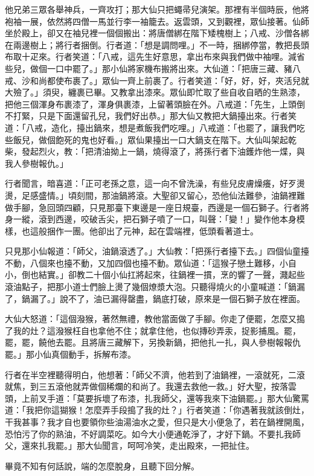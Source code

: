他兄弟三眾各舉神兵，一齊攻打；那大仙只把蠅帚兒演架。那裡有半個時辰，他將袍袖一展，依然將四僧一馬並行李一袖籠去。返雲頭，又到觀裡，眾仙接著。仙師坐於殿上，卻又在袖兒裡一個個搬出：將唐僧綁在階下矮槐樹上；八戒、沙僧各綁在兩邊樹上；將行者捆倒。行者道：「想是調問哩。」不一時，捆綁停當，教把長頭布取十疋來。行者笑道：「八戒，這先生好意思，拿出布來與我們做中袖哩。減省些兒，做個一口中罷了。」那小仙將家機布搬將出來。大仙道：「把唐三藏、豬八戒、沙和尚都使布裹了。」眾仙一齊上前裹了。行者笑道：「好，好，好，夾活兒就大殮了。」須臾，纏裹已畢。又教拿出漆來。眾仙即忙取了些自收自晒的生熟漆，把他三個渾身布裹漆了，渾身俱裹漆，上留著頭臉在外。八戒道：「先生，上頭倒不打緊，只是下面還留孔兒，我們好出恭。」那大仙又教把大鍋擡出來。行者笑道：「八戒，造化，擡出鍋來，想是煮飯我們吃哩。」八戒道：「也罷了，讓我們吃些飯兒，做個飽死的鬼也好看。」眾仙果擡出一口大鍋支在階下。大仙叫架起乾柴，發起烈火，教：「把清油拗上一鍋，燒得滾了，將孫行者下油鑊炸他一煠，與我人參樹報仇。」

行者聞言，暗喜道：「正可老孫之意，這一向不曾洗澡，有些兒皮膚燥癢，好歹燙燙，足感盛情。」頃刻間，那油鍋將滾。大聖卻又留心，恐他仙法難參，油鍋裡難做手腳，急回頭四顧，只見那臺下東邊是一座日規臺，西邊是一個石獅子。行者將身一縱，滾到西邊，咬破舌尖，把石獅子噴了一口，叫聲：「變！」變作他本身模樣，也這般捆作一團。他卻出了元神，起在雲端裡，低頭看著道士。

只見那小仙報道：「師父，油鍋滾透了。」大仙教：「把孫行者擡下去。」四個仙童擡不動，八個來也擡不動，又加四個也擡不動。眾仙道：「這猴子戀土難移，小自小，倒也結實。」卻教二十個小仙扛將起來，往鍋裡一摜，烹的響了一聲，濺起些滾油點子，把那小道士們臉上燙了幾個燎漿大泡。只聽得燒火的小童喊道：「鍋漏了，鍋漏了。」說不了，油已漏得罄盡，鍋底打破，原來是一個石獅子放在裡面。

大仙大怒道：「這個潑猴，著然無禮，教他當面做了手腳。你走了便罷，怎麼又搗了我的灶？這潑猴枉自也拿他不住；就拿住他，也似摶砂弄汞，捉影捕風。罷，罷，罷，饒他去罷。且將唐三藏解下，另換新鍋，把他扎一扎，與人參樹報報仇罷。」那小仙真個動手，拆解布漆。

行者在半空裡聽得明白，他想著：「師父不濟，他若到了油鍋裡，一滾就死，二滾就焦，到三五滾他就弄做個稀爛的和尚了。我還去救他一救。」好大聖，按落雲頭，上前叉手道：「莫要拆壞了布漆，扎我師父，還等我來下油鍋罷。」那大仙驚罵道：「我把你這猢猴！怎麼弄手段搗了我的灶？」行者笑道：「你遇著我就該倒灶，干我甚事？我才自也要領你些油湯油水之愛，但只是大小便急了，若在鍋裡開風，恐怕污了你的熟油，不好調菜吃。如今大小便通乾淨了，才好下鍋。不要扎我師父，還來扎我罷。」那大仙聞言，呵呵冷笑，走出殿來，一把扯住。

畢竟不知有何話說，端的怎麼脫身，且聽下回分解。
